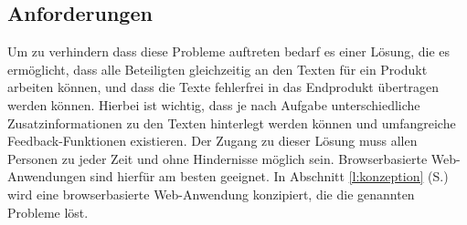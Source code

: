 \subsection{Anforderungen}

\TODO

Um zu verhindern dass diese Probleme auftreten bedarf es einer Lösung, die es ermöglicht, dass alle Beteiligten gleichzeitig an den Texten für ein Produkt arbeiten können, und dass die Texte fehlerfrei in das Endprodukt übertragen werden können. Hierbei ist wichtig, dass je nach Aufgabe unterschiedliche Zusatzinformationen zu den Texten hinterlegt werden können und umfangreiche Feedback-Funktionen existieren. Der Zugang zu dieser Lösung muss allen Personen zu jeder Zeit und ohne Hindernisse möglich sein. Browserbasierte Web-Anwendungen sind hierfür am besten geeignet. In Abschnitt \ref{l:konzeption} (S.\pageref{l:konzeption}) wird eine browserbasierte Web-Anwendung konzipiert, die die genannten Probleme löst. 
